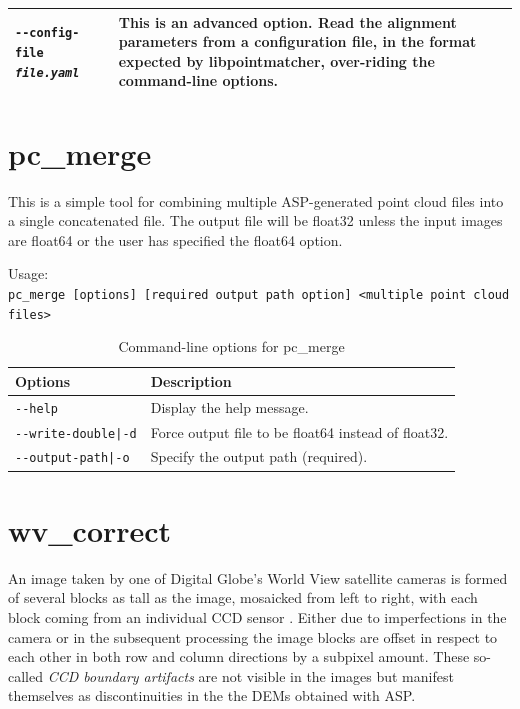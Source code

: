 \begin{longtable}{|p{8cm}|p{9cm}|}
\texttt{-\/-config-file \textit{file.yaml}} & This is an advanced
option. Read the alignment parameters from a configuration file, in the
format expected by libpointmatcher, over-riding the command-line options.\\ \hline

\end{longtable}




\section{pc\_merge}
\label{pcmerge}

This is a simple tool for combining multiple ASP-generated point cloud files into
a single concatenated file.  The output file will be float32 unless the input images
are float64 or the user has specified the float64 option.


\medskip

Usage:\\
\hspace*{2em}\texttt{pc\_merge [options] [required output path option] <multiple point cloud files>}

\medskip

\begin{longtable}{|l|p{10cm}|}
\caption{Command-line options for pc\_merge}
\label{tbl:pcmerge}
\endfirsthead
\endhead
\endfoot
\endlastfoot
\hline
Options & Description \\ \hline \hline
\texttt{-\/-help} & Display the help message.\\ \hline
\texttt{-\/-write-double|-d} & Force output file to be float64 instead of float32.\\ \hline
\texttt{-\/-output-path|-o} & Specify the output path (required).\\ \hline
\end{longtable}




\section{wv\_correct}
\label{wvcorrect}

An image taken by one of Digital Globe's World View satellite cameras is
formed of several blocks as tall as the image, mosaicked from left to
right, with each block coming from an individual CCD sensor
\cite{digital-globe:camera}. Either due to imperfections in the camera
or in the subsequent processing the image blocks are offset in
respect to each other in both row and column directions by a subpixel
amount. These so-called {\it CCD boundary artifacts} are not visible in
the images but manifest themselves as discontinuities in the the DEMs
obtained with ASP.

